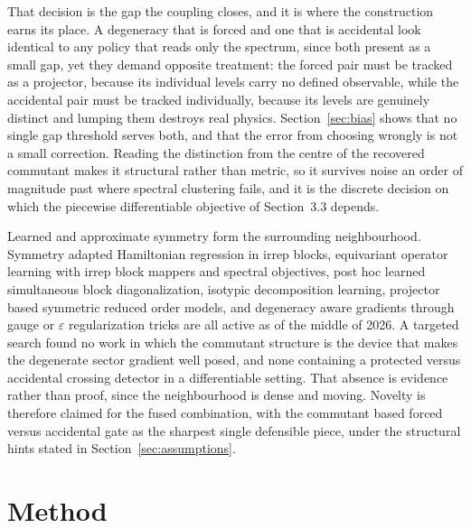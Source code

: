 \documentclass[11pt]{article}
\begin{document}
That decision is the gap the coupling closes, and it is where the construction
earns its place. A degeneracy that is forced and one that is accidental look
identical to any policy that reads only the spectrum, since both present as a
small gap, yet they demand opposite treatment: the forced pair must be tracked
as a projector, because its individual levels carry no defined observable, while
the accidental pair must be tracked individually, because its levels are
genuinely distinct and lumping them destroys real physics. Section~\ref{sec:bias}
shows that no single gap threshold serves both, and that the error from choosing
wrongly is not a small correction. Reading the distinction from the centre of
the recovered commutant makes it structural rather than metric, so it survives
noise an order of magnitude past where spectral clustering fails, and it is the
discrete decision on which the piecewise differentiable objective of
Section~3.3 depends.

Learned and approximate symmetry form the surrounding neighbourhood. Symmetry
adapted Hamiltonian regression in irrep blocks, equivariant operator learning
with irrep block mappers and spectral objectives, post hoc learned simultaneous
block diagonalization, isotypic decomposition learning, projector based
symmetric reduced order models, and degeneracy aware gradients through gauge or
$\varepsilon$ regularization tricks are all active as of the middle of 2026. A
targeted search found no work in which the commutant structure is the device
that makes the degenerate sector gradient well posed, and none containing a
protected versus accidental crossing detector in a differentiable setting. That
absence is evidence rather than proof, since the neighbourhood is dense and
moving. Novelty is therefore claimed for the fused combination, with the
commutant based forced versus accidental gate as the sharpest single defensible
piece, under the structural hints stated in Section~\ref{sec:assumptions}.

\section{Method}
\end{document}
